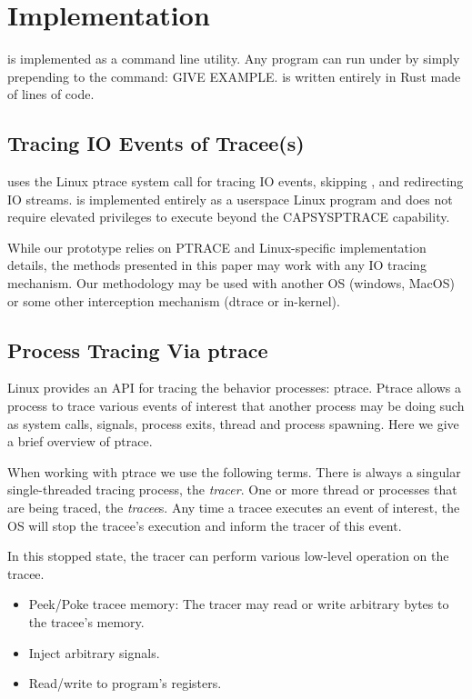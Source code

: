 \section{\pc Implementation}

\pc is implemented as a command line utility. Any program can run under \pc by simply prepending \pc to the command: GIVE EXAMPLE. \pc is written entirely in Rust made of \systemLOC lines of code.
\subsection{Tracing IO Events of Tracee(s)}
\pc uses the Linux ptrace system call for tracing IO events, skipping \cacheunit, and redirecting IO streams. \pc is implemented entirely as a userspace Linux program and does not require elevated privileges to execute beyond the CAP\textunderscore SYS\textunderscore PTRACE capability.

While our prototype relies on PTRACE and Linux-specific implementation details, the methods presented in this paper may work with any IO tracing mechanism. Our methodology may be used with another OS (windows, MacOS) or some other interception mechanism (dtrace or in-kernel).

\subsection{Process Tracing Via ptrace}
Linux provides an API for tracing the behavior processes: ptrace. Ptrace allows a process to trace various
events of interest that another process may be doing such as system calls, signals, process exits,
thread and process spawning. Here we give a brief overview of ptrace.

When working with ptrace we use the following terms. There is always a singular single-threaded tracing process, the \textit{tracer}. One or more thread or processes that are being traced, the \textit{tracee}s. Any time a tracee executes an event of interest, the OS will stop the tracee's execution and inform the tracer of this event.

In this stopped state, the tracer can perform various low-level operation on the tracee.
\begin{itemize}
  \item Peek/Poke tracee memory: The tracer may read or write arbitrary bytes to the tracee's memory.
  \item Inject arbitrary signals.
  \item Read/write to program's registers.
\end{itemize}

